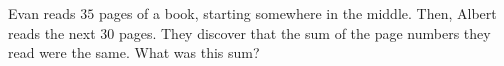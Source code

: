 Evan reads $35$ pages of a book, starting somewhere in the middle. Then, Albert reads the next $30$ pages. They discover that the sum of the page numbers they read were the same. What was this sum?
